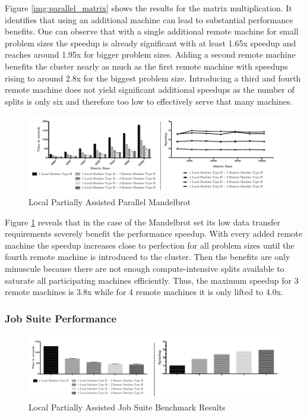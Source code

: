 Figure \ref{img:parallel_matrix} shows the results for the matrix multiplication. It identifies that using an additional machine can lead to substantial performance benefits. One can observe that with a single additional remote machine for small problem sizes the speedup is already significant with at least 1.65x speedup and reaches around 1.95x for bigger problem sizes. Adding a second remote machine benefits the cluster nearly as much as the first remote machine with speedups rising to around 2.8x for the biggest problem size. Introducing a third and fourth remote machine does not yield significant additional speedups as the number of splits is only six and therefore too low to effectively serve that many machines.

\begin{figure}[!htb]

	\includegraphics[width=1.0\textwidth]{images/local_partially_assisted_mandelbrot.pdf}
	\centering
	\caption{Local Partially Assisted Parallel Mandelbrot}
	\label{img:parallel_mandelbrot}
\end{figure}

Figure \ref{img:parallel_mandelbrot} reveals that in the case of the Mandelbrot set its low data transfer requirements severely benefit the performance speedup. With every added remote machine the speedup increases close to perfection for all problem sizes until the fourth remote machine is introduced to the cluster. Then the benefits are only minuscule because there are not enough compute-intensive splits available to saturate all participating machines efficiently. Thus, the maximum speedup for 3 remote machines is 3.8x while for 4 remote machines it is only lifted to 4.0x.


\subsubsection*{Job Suite Performance}
\label{job_suite_performance}

\begin{figure}[!htb]

	\includegraphics[width=1.0\textwidth]{images/local_partially_assisted_full_benchmark.pdf}
	\centering
	\caption{Local Partially Assisted Job Suite Benchmark Results}
	\label{img:local_benchmark_results}
\end{figure}

